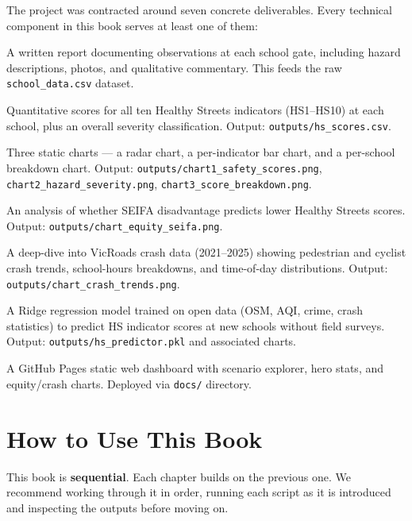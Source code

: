 \documentclass[11pt,a4paper,openany]{book}
\begin{document}
The project was contracted around seven concrete deliverables. Every technical component in this book serves at least one of them:

\begin{description}[leftmargin=1.5cm,style=nextline]
  \item[D1 --- Field Assessment Report]
    A written report documenting observations at each school gate, including hazard descriptions, photos, and qualitative commentary. This feeds the raw \texttt{school\_data.csv} dataset.
  \item[D2 --- Healthy Streets Scores]
    Quantitative scores for all ten Healthy Streets indicators (HS1--HS10) at each school, plus an overall severity classification. Output: \texttt{outputs/hs\_scores.csv}.
  \item[D3 --- Visualisation Suite]
    Three static charts --- a radar chart, a per-indicator bar chart, and a per-school breakdown chart. Output: \texttt{outputs/chart1\_safety\_scores.png}, \texttt{chart2\_hazard\_severity.png}, \texttt{chart3\_score\_breakdown.png}.
  \item[D4 --- Equity Analysis]
    An analysis of whether SEIFA disadvantage predicts lower Healthy Streets scores. Output: \texttt{outputs/chart\_equity\_seifa.png}.
  \item[D5 --- Crash Trend Analysis]
    A deep-dive into VicRoads crash data (2021--2025) showing pedestrian and cyclist crash trends, school-hours breakdowns, and time-of-day distributions. Output: \texttt{outputs/chart\_crash\_trends.png}.
  \item[D6 --- Machine Learning Pipeline]
    A Ridge regression model trained on open data (OSM, AQI, crime, crash statistics) to predict HS indicator scores at new schools without field surveys. Output: \texttt{outputs/hs\_predictor.pkl} and associated charts.
  \item[D7 --- Interactive Dashboard]
    A GitHub Pages static web dashboard with scenario explorer, hero stats, and equity/crash charts. Deployed via \texttt{docs/} directory.
\end{description}

\section{How to Use This Book}

This book is \textbf{sequential}. Each chapter builds on the previous one. We recommend working through it in order, running each script as it is introduced and inspecting the outputs before moving on.
\end{document}
